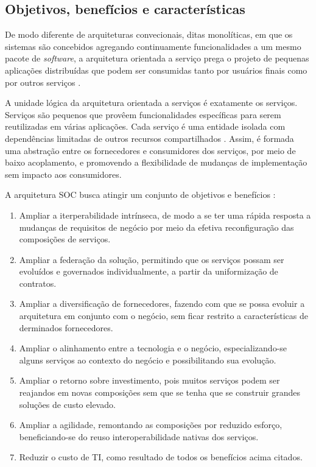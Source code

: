 \subsection{Objetivos, benefícios e características}
\vspace{-6mm}

De modo diferente de arquiteturas convecionais, ditas monolíticas, em que os
sistemas são concebidos agregando continuamente funcionalidades a um mesmo pacote de
\textit{software}, a arquitetura orientada a serviço prega o projeto de pequenas
aplicações distribuídas que podem ser consumidas tanto por usuários finais como
por outros serviços \cite{papazoglou2007serviceApprTechRechIss}. 

A unidade lógica da arquitetura orientada a serviços é exatamente os serviços.
Serviços são pequenos que provêem funcionalidades específicas para serem
reutilizadas em várias aplicações. Cada serviço é uma entidade isolada com
dependências limitadas de outros recursos compartilhados
\cite{serrano2014service}. Assim, é formada uma abstração entre os fornecedores
e consumidores dos serviços, por meio de baixo acoplamento, e promovendo a
flexibilidade de mudanças de implementação sem impacto aos consumidores.

A arquitetura SOC busca atingir um conjunto de objetivos e benefícios
\cite{erl2008soaDesigPatterns}:
\begin{enumerate}[label=(\alph*)] 
  \item Ampliar a iterperabilidade intrínseca, de modo a se ter uma rápida
  resposta a mudanças de requisitos de negócio por meio da efetiva
  reconfiguração das composições de serviços.
  \item Ampliar a federação da solução, permitindo que os serviços possam ser
  evoluídos e governados individualmente, a partir da uniformização de
  contratos.
  \item Ampliar a diversificação de fornecedores, fazendo com que se possa
  evoluir a arquitetura em conjunto com o negócio, sem ficar restrito a
  características de derminados fornecedores.
  \item Ampliar o alinhamento entre a tecnologia e o negócio, especializando-se
  alguns serviços ao contexto do negócio e possibilitando sua evolução.
  \item Ampliar o retorno sobre investimento, pois muitos serviços podem
  ser reajandos em novas composições sem que se tenha que se construir grandes
  soluções de custo elevado.
  \item Ampliar a agilidade, remontando as composições por reduzido esforço,
  beneficiando-se do reuso interoperabilidade nativas dos serviços.
  \item Reduzir o custo de TI, como resultado de todos os benefícios acima
  citados.
\end{enumerate}

